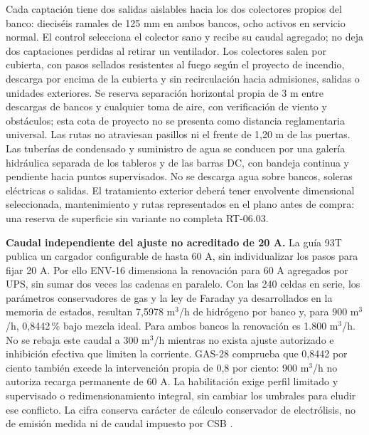 Cada captación tiene dos salidas aislables hacia los dos colectores propios del banco: dieciséis ramales de 125 mm en ambos bancos, ocho activos en servicio normal. El control selecciona el colector sano y recibe su caudal agregado; no deja dos captaciones perdidas al retirar un ventilador. Los colectores salen por cubierta, con pasos sellados resistentes al fuego según el proyecto de incendio, descarga por encima de la cubierta y sin recirculación hacia admisiones, salidas o unidades exteriores. Se reserva separación horizontal propia de 3 m entre descargas de bancos y cualquier toma de aire, con verificación de viento y obstáculos; esta cota de proyecto no se presenta como distancia reglamentaria universal. Las rutas no atraviesan pasillos ni el frente de 1,20 m de las puertas. Las tuberías de condensado y suministro de agua se conducen por una galería hidráulica separada de los tableros y de las barras DC, con bandeja continua y pendiente hacia puntos supervisados. No se descarga agua sobre bancos, soleras eléctricas o salidas. El tratamiento exterior deberá tener envolvente dimensional seleccionada, mantenimiento y rutas representados en el plano antes de compra: una reserva de superficie sin variante no completa RT-06.03.

\textbf{Caudal independiente del ajuste no acreditado de 20 A.} La guía 93T publica un cargador configurable de hasta 60 A, sin individualizar los pasos para fijar 20 A. Por ello ENV-16 dimensiona la renovación para 60 A agregados por UPS, sin sumar dos veces las cadenas en paralelo. Con las 240 celdas en serie, los parámetros conservadores de gas y la ley de Faraday ya desarrollados en la memoria de estados, resultan 7,5978 m$^3$/h de hidrógeno por banco y, para 900 m$^3$/h, 0,8442\,\% bajo mezcla ideal. Para ambos bancos la renovación es 1.800 m$^3$/h. No se rebaja este caudal a 300 m$^3$/h mientras no exista ajuste autorizado e inhibición efectiva que limiten la corriente. GAS-28 comprueba que 0,8442 por ciento también excede la intervención propia de 0,8 por ciento: 900 m$^3$/h no autoriza recarga permanente de 60 A. La habilitación exige perfil limitado y supervisado o redimensionamiento integral, sin cambiar los umbrales para eludir ese conflicto. La cifra conserva carácter de cálculo conservador de electrólisis, no de emisión medida ni de caudal impuesto por CSB \parencites[p.~98]{p7-eaton-93t-guia}{csbManualJunio2025}{nistCODATA2022}.

